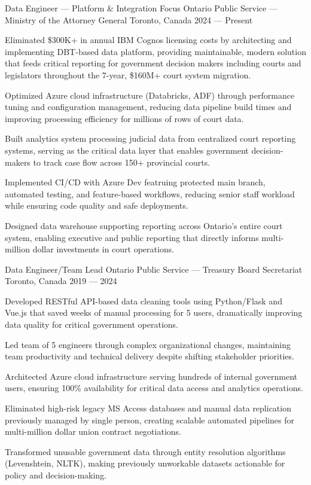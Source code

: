 \begin{cventries}

\cventry%
	{Data Engineer --- Platform \& Integration Focus}
	{Ontario Public Service --- Ministry of the Attorney General}
	{Toronto, Canada}
	{2024 --- Present}
	{
		\begin{cvitems}
			\item Eliminated \$300K+ in annual IBM Cognos licensing costs by architecting and implementing DBT-based data platform, providing maintainable, modern solution that feeds critical reporting for government decision makers including courts and legislators throughout the 7-year, \$160M+ court system migration.
			\item Optimized Azure cloud infrastructure (Databricks, ADF) through performance tuning and configuration management, reducing data pipeline build times and improving processing efficiency for millions of rows of court data.
			\item Built analytics system processing judicial data from centralized court reporting systems, serving as the critical data layer that enables government decision-makers to track case flow across 150+ provincial courts.
			\item Implemented CI/CD with Azure Dev featruing protected main branch, automated testing, and feature-based workflows, reducing senior staff workload while ensuring code quality and safe deployments.
			\item Designed data warehouse supporting reporting across Ontario's entire court system, enabling executive and public reporting that directly informs multi-million dollar investments in court operations.
		\end{cvitems}
	}

\cventry%
	{Data Engineer/Team Lead}
	{Ontario Public Service --- Treasury Board Secretariat}
	{Toronto, Canada}
	{2019 --- 2024}
	{
		\begin{cvitems}
			\item Developed RESTful API-based data cleaning tools using Python/Flask and Vue.js that saved weeks of manual processing for 5 users, dramatically improving data quality for critical government operations.
			\item Led team of 5 engineers through complex organizational changes, maintaining team productivity and technical delivery despite shifting stakeholder priorities.
			\item Architected Azure cloud infrastructure serving hundreds of internal government users, ensuring 100\% availability for critical data access and analytics operations.
			\item Eliminated high-risk legacy MS Access databases and manual data replication previously managed by single person, creating scalable automated pipelines for multi-million dollar union contract negotiations.
			\item Transformed unusable government data through entity resolution algorithms (Levenshtein, NLTK), making previously unworkable datasets actionable for policy and decision-making.
		\end{cvitems}
	}


\end{cventries}
